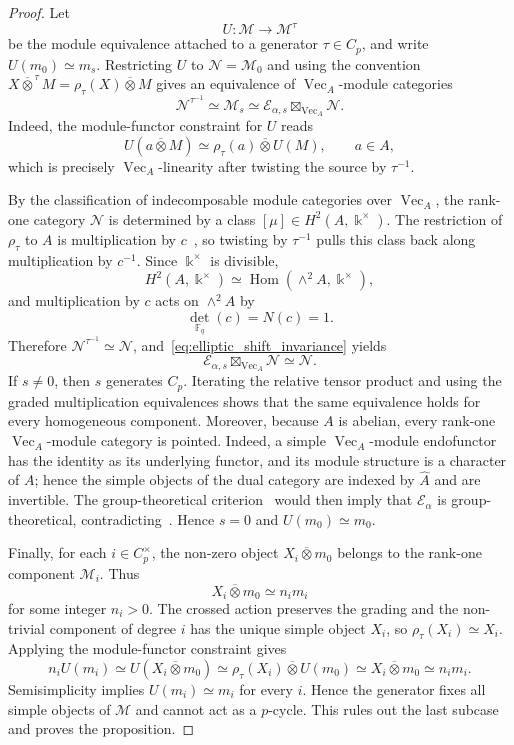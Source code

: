 \documentclass[12pt]{amsart}
\theoremstyle{plain}
\theoremstyle{definition} %
\theoremstyle{remark} %
\newcommand{\ku}{{\Bbbk}} %
\DeclareMathOperator{\VecCat}{Vec}
\newcommand{\Vect}[1]{\VecCat_{#1}}
\newcommand{\cE}{\mathcal{E}}
\newcommand{\cM}{\mathcal{M}}
\newcommand{\cN}{\mathcal{N}}
\newcommand{\Hom}{\operatorname{Hom}}
\begin{document}
\begin{proof}
Let
\[
U:\cM\longrightarrow \cM^\tau
\]
be the module equivalence attached to a generator $\tau\in C_p$, and write $U(m_0)\simeq m_s$. Restricting $U$ to $\cN=\cM_0$ and using the convention $X\overline\otimes^{\,\tau}M=\rho_\tau(X)\overline\otimes M$ gives an equivalence of $\Vect{A}$-module categories
\begin{equation}\label{eq:elliptic_shift_invariance}
\cN^{\tau^{-1}}
\simeq \cM_s
\simeq \cE_{\alpha,s}\boxtimes_{\Vect{A}}\cN.
\end{equation}
Indeed, the module-functor constraint for $U$ reads
\[
U(a\overline\otimes M)\simeq \rho_\tau(a)\overline\otimes U(M),
\qquad a\in A,
\]
which is precisely $\Vect{A}$-linearity after twisting the source by $\tau^{-1}$.

By the classification of indecomposable module categories over $\Vect{A}$, the rank-one category $\cN$ is determined by a class $[\mu]\in H^2(A,\ku^\times)$. The restriction of $\rho_\tau$ to $A$ is multiplication by $c$~\cite[Definition~3.1 and the proof of Proposition~4.2]{GPR24}, so twisting by $\tau^{-1}$ pulls this class back along multiplication by $c^{-1}$. Since $\ku^\times$ is divisible,
\[
H^2(A,\ku^\times)\simeq \Hom(\wedge^2 A,\ku^\times),
\]
and multiplication by $c$ acts on $\wedge^2 A$ by
\[
\det_{\mathbb F_q}(c)=N(c)=1.
\]
Therefore $\cN^{\tau^{-1}}\simeq\cN$, and~\eqref{eq:elliptic_shift_invariance} yields
\[
\cE_{\alpha,s}\boxtimes_{\Vect{A}}\cN\simeq\cN.
\]
If $s\ne0$, then $s$ generates $C_p$. Iterating the relative tensor product and using the graded multiplication equivalences shows that the same equivalence holds for every homogeneous component. Moreover, because $A$ is abelian, every rank-one $\Vect{A}$-module category is pointed. Indeed, a simple $\Vect{A}$-module endofunctor has the identity as its underlying functor, and its module structure is a character of $A$; hence the simple objects of the dual category are indexed by $\widehat A$ and are invertible. The group-theoretical criterion~\cite[Theorem~16]{MeMu12} would then imply that $\cE_\alpha$ is group-theoretical, contradicting~\cite[Theorem~4.4]{GPR24}. Hence $s=0$ and $U(m_0)\simeq m_0$.

Finally, for each $i\in C_p^\times$, the non-zero object $X_i\overline\otimes m_0$ belongs to the rank-one component $\cM_i$. Thus
\[
X_i\overline\otimes m_0\simeq n_i m_i
\]
for some integer $n_i>0$. The crossed action preserves the grading and the non-trivial component of degree $i$ has the unique simple object $X_i$, so $\rho_\tau(X_i)\simeq X_i$. Applying the module-functor constraint gives
\[
n_iU(m_i)
\simeq U(X_i\overline\otimes m_0)
\simeq \rho_\tau(X_i)\overline\otimes U(m_0)
\simeq X_i\overline\otimes m_0
\simeq n_i m_i.
\]
Semisimplicity implies $U(m_i)\simeq m_i$ for every $i$. Hence the generator fixes all simple objects of $\cM$ and cannot act as a $p$-cycle. This rules out the last subcase and proves the proposition.
\end{proof}
\end{document}
